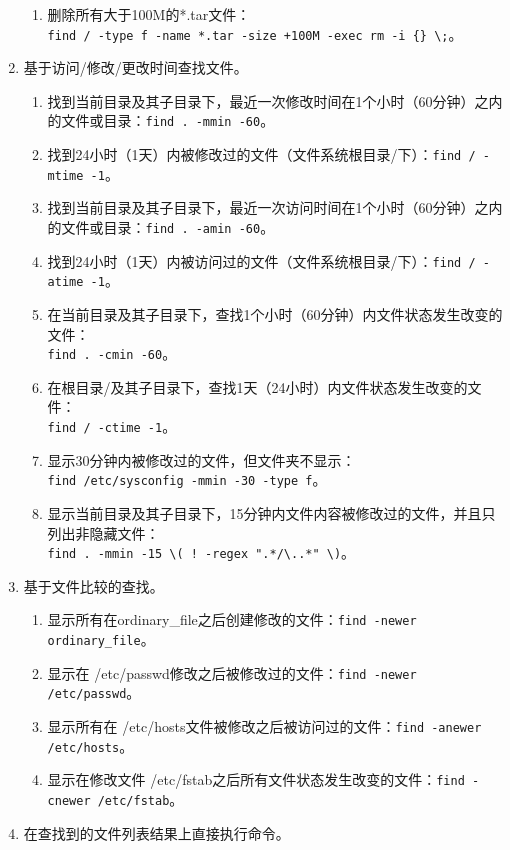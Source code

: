 \begin{enumerate}
\begin{enumerate}
      \item 删除所有大于100M的*.tar文件：\\ \verb|find / -type f -name *.tar -size +100M -exec rm -i {} \;|。
    \end{enumerate}
  \item 基于访问/修改/更改时间查找文件。
    \begin{enumerate}
      \item 找到当前目录及其子目录下，最近一次修改时间在1个小时（60分钟）之内的文件或目录：\verb|find . -mmin -60|。
      \item 找到24小时（1天）内被修改过的文件（文件系统根目录/下）：\verb|find / -mtime -1|。
      \item 找到当前目录及其子目录下，最近一次访问时间在1个小时（60分钟）之内的文件或目录：\verb|find . -amin -60|。
      \item 找到24小时（1天）内被访问过的文件（文件系统根目录/下）：\verb|find / -atime -1|。
      \item 在当前目录及其子目录下，查找1个小时（60分钟）内文件状态发生改变的文件：\\ \verb|find . -cmin -60|。
      \item 在根目录/及其子目录下，查找1天（24小时）内文件状态发生改变的文件：\\ \verb|find / -ctime -1|。
      \item 显示30分钟内被修改过的文件，但文件夹不显示：\\ \verb|find /etc/sysconfig -mmin -30 -type f|。
      \item 显示当前目录及其子目录下，15分钟内文件内容被修改过的文件，并且只列出非隐藏文件：\\ \verb|find . -mmin -15 \( ! -regex ".*/\..*" \)|。
    \end{enumerate}
  \item 基于文件比较的查找。
    \begin{enumerate}
      \item 显示所有在ordinary\_file之后创建修改的文件：\verb|find -newer ordinary_file|。
      \item 显示在 /etc/passwd修改之后被修改过的文件：\verb|find -newer /etc/passwd|。
      \item 显示所有在 /etc/hosts文件被修改之后被访问过的文件：\verb|find -anewer /etc/hosts|。
      \item 显示在修改文件 /etc/fstab之后所有文件状态发生改变的文件：\verb|find -cnewer /etc/fstab|。
    \end{enumerate}
  \item 在查找到的文件列表结果上直接执行命令。

\end{enumerate}
